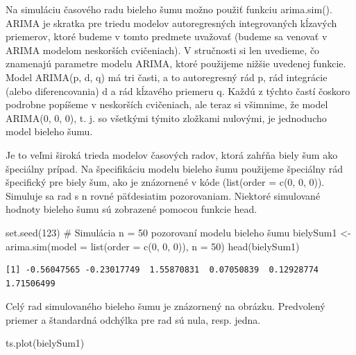 \documentclass[
  letterpaper,
  DIV=11,
  numbers=noendperiod]{scrreprt}
\newenvironment{Shaded}{\begin{snugshade}}{\end{snugshade}}
\newcommand{\AttributeTok}[1]{\textcolor[rgb]{0.40,0.45,0.13}{#1}}
\newcommand{\CommentTok}[1]{\textcolor[rgb]{0.37,0.37,0.37}{#1}}
\newcommand{\DecValTok}[1]{\textcolor[rgb]{0.68,0.00,0.00}{#1}}
\newcommand{\FunctionTok}[1]{\textcolor[rgb]{0.28,0.35,0.67}{#1}}
\newcommand{\NormalTok}[1]{\textcolor[rgb]{0.00,0.23,0.31}{#1}}
\newcommand{\OtherTok}[1]{\textcolor[rgb]{0.00,0.23,0.31}{#1}}
\begin{document}
Na simuláciu časového radu bieleho šumu možno použiť funkciu
arima.sim(). ARIMA je skratka pre triedu modelov autoregresných
integrovaných kĺzavých priemerov, ktoré budeme v tomto predmete uvažovať
(budeme sa venovať v ARIMA modelom neskorších cvičeniach). V stručnosti
si len uvedieme, čo znamenajú parametre modelu ARIMA, ktoré použijeme
nižšie uvedenej funkcie. Model ARIMA(p, d, q) má tri časti, a to
autoregresný rád p, rád integrácie (alebo diferencovania) d a rád
kĺzavého priemeru q. Každú z týchto častí čoskoro podrobne popíšeme v
neskorších cvičeniach, ale teraz si všimnime, že model ARIMA(0, 0, 0),
t. j. so všetkými týmito zložkami nulovými, je jednoducho model bieleho
šumu.

Je to veľmi široká trieda modelov časových radov, ktorá zahŕňa biely šum
ako špeciálny prípad. Na špecifikáciu modelu bieleho šumu použijeme
špeciálny rád špecifický pre biely šum, ako je znázornené v kóde
(list(order = c(0, 0, 0)). Simuluje sa rad s n rovné päťdesiatim
pozorovaniam. Niektoré simulované hodnoty bieleho šumu sú zobrazené
pomocou funkcie head.

\begin{Shaded}
\begin{Highlighting}[]
\FunctionTok{set.seed}\NormalTok{(}\DecValTok{123}\NormalTok{)}
\CommentTok{\# Simulácia n = 50 pozorovaní modelu bieleho šumu}
\NormalTok{bielySum1 }\OtherTok{\textless{}{-}} \FunctionTok{arima.sim}\NormalTok{(}\AttributeTok{model =} \FunctionTok{list}\NormalTok{(}\AttributeTok{order =} \FunctionTok{c}\NormalTok{(}\DecValTok{0}\NormalTok{, }\DecValTok{0}\NormalTok{, }\DecValTok{0}\NormalTok{)), }\AttributeTok{n =} \DecValTok{50}\NormalTok{)}
\FunctionTok{head}\NormalTok{(bielySum1)}
\end{Highlighting}
\end{Shaded}

\begin{verbatim}
[1] -0.56047565 -0.23017749  1.55870831  0.07050839  0.12928774  1.71506499
\end{verbatim}

Celý rad simulovaného bieleho šumu je znázornený na obrázku. Predvolený
priemer a štandardná odchýlka pre rad sú nula, resp. jedna.

\begin{Shaded}
\begin{Highlighting}[]
\FunctionTok{ts.plot}\NormalTok{(bielySum1)}
\end{Highlighting}
\end{Shaded}
\end{document}
